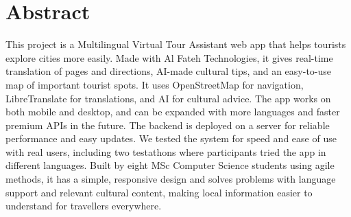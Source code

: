 \chapter*{Abstract}

This project is a Multilingual Virtual Tour Assistant web app that helps tourists explore cities more easily. Made with Al Fateh Technologies, it gives real-time translation of pages and directions, AI-made cultural tips, and an easy-to-use map of important tourist spots. It uses OpenStreetMap for navigation, LibreTranslate for translations, and AI for cultural advice. The app works on both mobile and desktop, and can be expanded with more languages and faster premium APIs in the future.
The backend is deployed on a server for reliable performance and easy updates. We tested the system for speed and ease of use with real users, including two testathons where participants tried the app in different languages. Built by eight MSc Computer Science students using agile methods, it has a simple, responsive design and solves problems with language support and relevant cultural content, making local information easier to understand for travellers everywhere.
